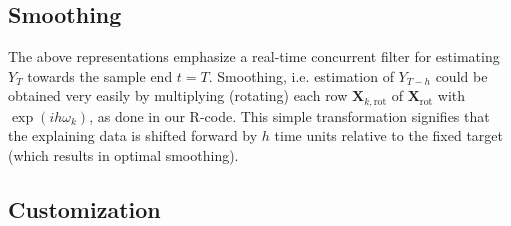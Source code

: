 \documentclass[11pt]{article}
\begin{document}
\subsection{Smoothing}
The above representations emphasize a real-time concurrent filter for estimating $Y_T$ towards the sample end $t=T$. Smoothing, i.e. estimation of $Y_{T-h}$ could be obtained very easily by multiplying (rotating) each row $\mathbf{X}_{k,\textrm{rot}}$ of  $\mathbf{X}_{\textrm{rot}}$ with $\exp(ih\omega_k)$, as done in our R-code. This simple transformation signifies that the explaining data is shifted forward by $h$ time units relative to the fixed target (which results in optimal smoothing).\\




\subsection{Customization}\label{sect_cust}
\end{document}
